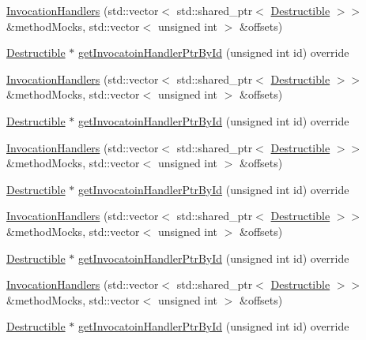 \begin{DoxyCompactItemize}
\item 
\mbox{\hyperlink{classfakeit_1_1InvocationHandlers_a2fd61aecd4f313aa0ca83b2ab438eeef}{Invocation\+Handlers}} (std\+::vector$<$ std\+::shared\+\_\+ptr$<$ \mbox{\hyperlink{classfakeit_1_1Destructible}{Destructible}} $>$$>$ \&method\+Mocks, std\+::vector$<$ unsigned int $>$ \&offsets)
\item 
\mbox{\hyperlink{classfakeit_1_1Destructible}{Destructible}} $\ast$ \mbox{\hyperlink{classfakeit_1_1InvocationHandlers_a47af368f009fc5e3cce950ebbab4c48d}{get\+Invocatoin\+Handler\+Ptr\+By\+Id}} (unsigned int id) override
\item 
\mbox{\hyperlink{classfakeit_1_1InvocationHandlers_a2fd61aecd4f313aa0ca83b2ab438eeef}{Invocation\+Handlers}} (std\+::vector$<$ std\+::shared\+\_\+ptr$<$ \mbox{\hyperlink{classfakeit_1_1Destructible}{Destructible}} $>$$>$ \&method\+Mocks, std\+::vector$<$ unsigned int $>$ \&offsets)
\item 
\mbox{\hyperlink{classfakeit_1_1Destructible}{Destructible}} $\ast$ \mbox{\hyperlink{classfakeit_1_1InvocationHandlers_a47af368f009fc5e3cce950ebbab4c48d}{get\+Invocatoin\+Handler\+Ptr\+By\+Id}} (unsigned int id) override
\item 
\mbox{\hyperlink{classfakeit_1_1InvocationHandlers_a2fd61aecd4f313aa0ca83b2ab438eeef}{Invocation\+Handlers}} (std\+::vector$<$ std\+::shared\+\_\+ptr$<$ \mbox{\hyperlink{classfakeit_1_1Destructible}{Destructible}} $>$$>$ \&method\+Mocks, std\+::vector$<$ unsigned int $>$ \&offsets)
\item 
\mbox{\hyperlink{classfakeit_1_1Destructible}{Destructible}} $\ast$ \mbox{\hyperlink{classfakeit_1_1InvocationHandlers_a47af368f009fc5e3cce950ebbab4c48d}{get\+Invocatoin\+Handler\+Ptr\+By\+Id}} (unsigned int id) override
\item 
\mbox{\hyperlink{classfakeit_1_1InvocationHandlers_a2fd61aecd4f313aa0ca83b2ab438eeef}{Invocation\+Handlers}} (std\+::vector$<$ std\+::shared\+\_\+ptr$<$ \mbox{\hyperlink{classfakeit_1_1Destructible}{Destructible}} $>$$>$ \&method\+Mocks, std\+::vector$<$ unsigned int $>$ \&offsets)
\item 
\mbox{\hyperlink{classfakeit_1_1Destructible}{Destructible}} $\ast$ \mbox{\hyperlink{classfakeit_1_1InvocationHandlers_a47af368f009fc5e3cce950ebbab4c48d}{get\+Invocatoin\+Handler\+Ptr\+By\+Id}} (unsigned int id) override
\item 
\mbox{\hyperlink{classfakeit_1_1InvocationHandlers_a2fd61aecd4f313aa0ca83b2ab438eeef}{Invocation\+Handlers}} (std\+::vector$<$ std\+::shared\+\_\+ptr$<$ \mbox{\hyperlink{classfakeit_1_1Destructible}{Destructible}} $>$$>$ \&method\+Mocks, std\+::vector$<$ unsigned int $>$ \&offsets)
\item 
\mbox{\hyperlink{classfakeit_1_1Destructible}{Destructible}} $\ast$ \mbox{\hyperlink{classfakeit_1_1InvocationHandlers_a47af368f009fc5e3cce950ebbab4c48d}{get\+Invocatoin\+Handler\+Ptr\+By\+Id}} (unsigned int id) override
\end{DoxyCompactItemize}
